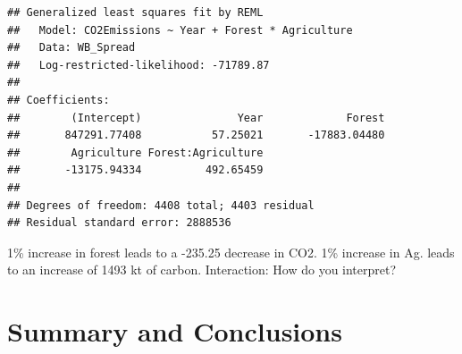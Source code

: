 \documentclass[12pt,]{article}
\begin{document}
\begin{verbatim}
## Generalized least squares fit by REML
##   Model: CO2Emissions ~ Year + Forest * Agriculture 
##   Data: WB_Spread 
##   Log-restricted-likelihood: -71789.87
## 
## Coefficients:
##        (Intercept)               Year             Forest 
##       847291.77408           57.25021       -17883.04480 
##        Agriculture Forest:Agriculture 
##       -13175.94334          492.65459 
## 
## Degrees of freedom: 4408 total; 4403 residual
## Residual standard error: 2888536
\end{verbatim}

1\% increase in forest leads to a -235.25 decrease in CO2. 1\% increase
in Ag. leads to an increase of 1493 kt of carbon. Interaction: How do
you interpret?

\newpage

\section{Summary and Conclusions}\label{summary-and-conclusions}
\end{document}
